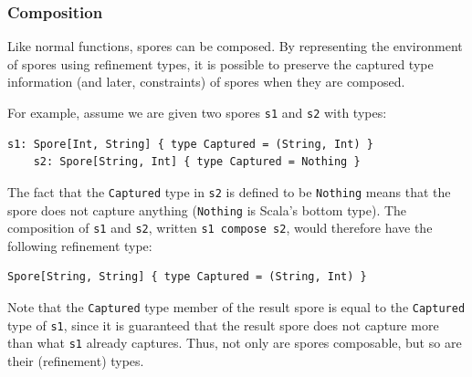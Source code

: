 \documentclass{easychair}
\begin{document}
\subsubsection{Composition}

Like normal functions, spores can be composed. By representing the environment
of spores using refinement types, it is possible to preserve the captured type
information (and later, constraints) of spores when they are composed.

For example, assume we are given two spores \verb|s1| and \verb|s2| with types:

\begin{lstlisting}[numbers=none]
    s1: Spore[Int, String] { type Captured = (String, Int) }
    s2: Spore[String, Int] { type Captured = Nothing }
\end{lstlisting}

\noindent The fact that the \verb|Captured| type in \verb|s2| is defined to be
\verb|Nothing| means that the spore does not capture anything (\verb|Nothing|
is Scala's bottom type). The composition of \verb|s1| and \verb|s2|, written
\verb|s1 compose s2|, would therefore have the following refinement type:

\begin{lstlisting}[numbers=none]
    Spore[String, String] { type Captured = (String, Int) }
\end{lstlisting}

\noindent Note that the \verb|Captured| type member of the result spore is equal to the
\verb|Captured| type of \verb|s1|, since it is guaranteed that the result
spore does not capture more than what \verb|s1| already captures. Thus, not
only are spores composable, but so are their (refinement) types.
\end{document}
